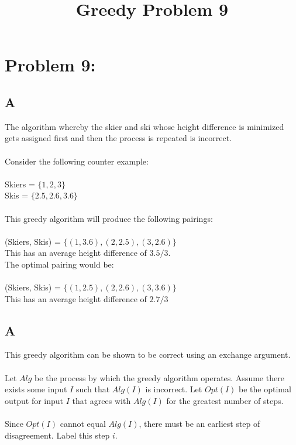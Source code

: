 \documentclass{article}
\begin{document}
\title{Greedy Problem 9}
\renewcommand{\today}{4 September 2016}
\maketitle

\section{Problem 9:}
\subsection{A}

The algorithm whereby the skier and ski whose height difference
is minimized gets assigned first and then the process is repeated
is incorrect.\\\\
Consider the following counter example:\\\\
Skiers = $\{1,2,3\}$\\
Skis = $\{2.5, 2.6, 3.6\}$\\\\
This greedy algorithm will produce the following pairings:\\\\
(Skiers, Skis) = $\{(1,3.6),(2,2.5),(3,2.6)\}$\\
This has an average height difference of $3.5/3$.\\
The optimal pairing would be:\\\\
(Skiers, Skis) = $\{(1,2.5),(2,2.6),(3,3.6)\}$\\
This has an average height difference of $2.7/3$

\subsection{A}
This greedy algorithm can be shown to be correct using an
exchange argument.\\\\
Let $Alg$ be the process by which the greedy algorithm operates.
Assume there exists some input $I$ such that $Alg(I)$ is incorrect.
Let $Opt(I)$ be the optimal output for input $I$ that agrees with
$Alg(I)$ for the greatest number of steps.\\\\
Since $Opt(I)$ cannot equal $Alg(I)$, there must be an earliest
step of disagreement.  Label this step $i$.
\end{document}
